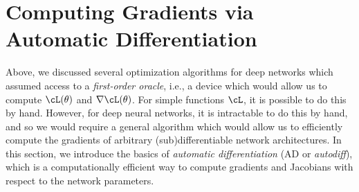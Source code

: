 \documentclass[../../book-main.tex]{subfiles}
\begin{document}




\section{Computing Gradients via Automatic Differentiation}

Above, we discussed several optimization algorithms for deep networks which assumed access to a \textit{first-order oracle}, i.e., a device which would allow us to compute \(\cL(\theta)\) and \(\nabla \cL(\theta)\). For simple functions \(\cL\), it is possible to do this by hand. However, for deep neural networks, it is intractable to do this by hand, and so we would require a general algorithm which would allow us to efficiently compute the gradients of arbitrary (sub)differentiable network architectures. In this section, we introduce the basics of \textit{automatic differentiation} (AD or \textit{autodiff}), which is a computationally efficient way to compute gradients and Jacobians with respect to the network parameters.
\end{document}
